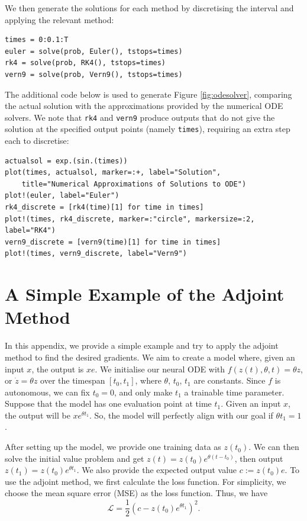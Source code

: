 \documentclass[a4paper,11pt,titlepage]{article}
\theoremstyle{definition}
\theoremstyle{plain}
\theoremstyle{remark}
\begin{document}
We then generate the solutions for each method by discretising the interval and applying the relevant method:
\begin{verbatim}
times = 0:0.1:T
euler = solve(prob, Euler(), tstops=times)
rk4 = solve(prob, RK4(), tstops=times)
vern9 = solve(prob, Vern9(), tstops=times)
\end{verbatim}

The additional code below is used to generate Figure \ref{fig:odesolver}, comparing the actual solution with the approximations provided by the numerical ODE solvers. We note that \texttt{rk4} and \texttt{vern9} produce outputs that do not give the solution at the specified output points (namely \texttt{times}), requiring an extra step each to discretise:
\begin{verbatim}
actualsol = exp.(sin.(times))
plot(times, actualsol, marker=:+, label="Solution", 
    title="Numerical Approximations of Solutions to ODE")
plot!(euler, label="Euler")
rk4_discrete = [rk4(time)[1] for time in times]
plot!(times, rk4_discrete, marker=:"circle", markersize=:2, label="RK4")
vern9_discrete = [vern9(time)[1] for time in times]
plot!(times, vern9_discrete, label="Vern9")
\end{verbatim}

\pagebreak
\section{A Simple Example of the Adjoint Method}
\label{sec:adjmethod}

In this appendix, we provide a simple example and try to apply the adjoint method to find the desired gradients. We aim to create a model where, given an input $x$, the output is $xe$. We initialise our neural ODE with $f(z(t),\theta,t)=\theta z$, or $\dot{z}=\theta z$ over the timespan $[t_0,t_1]$, where $\theta$, $t_0$, $t_1$ are constants. Since $f$ is autonomous, we can fix $t_0 = 0$, and only make $t_1$ a trainable time parameter. Suppose that the model has one evaluation point at time $t_1$. Given an input $x$, the output will be $xe^{\theta t_1}$. So, the model will perfectly align with our goal if $\theta t_1=1$.

After setting up the model, we provide one training data as $z(t_0)$. We can then solve the initial value problem and get $z(t) = z(t_0)e^{\theta(t-t_0)}$, then output $z(t_1)=z(t_0)e^{\theta t_1}$. We also provide the expected output value $c:=z(t_0)e$.
To use the adjoint method, we first calculate the loss function. For simplicity, we choose the mean square error (MSE) as the loss function. Thus, we have
$$\mathcal{L} = \frac{1}{2}\left(c-z(t_0)e^{\theta t_1}\right)^2.$$
\end{document}
